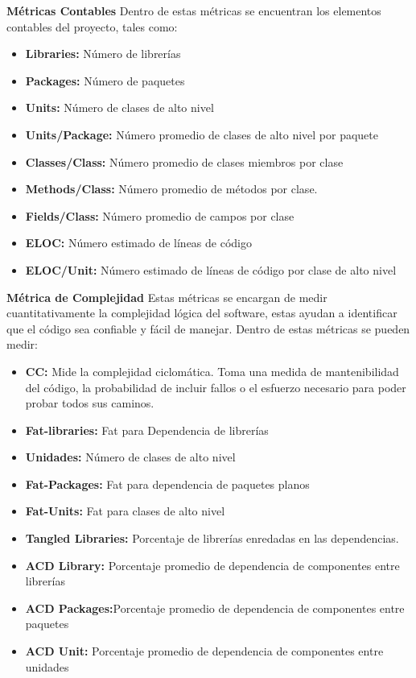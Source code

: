 \textbf{Métricas Contables} Dentro de estas métricas se encuentran los elementos contables del proyecto, tales como:
\begin{itemize}[itemsep=1mm,topsep=0pt,leftmargin=0.6in]
	\item\textbf{Libraries:} Número de librerías
	\item\textbf{Packages:} Número de paquetes
	\item\textbf{Units:} Número de clases de alto nivel
	\item\textbf{Units/Package:} Número promedio de clases de alto nivel por paquete
	\item\textbf{Classes/Class:} Número promedio de clases miembros por clase
	\item\textbf{Methods/Class:} Número promedio de métodos por clase.
	\item\textbf{Fields/Class:} Número promedio de campos por clase
	\item\textbf{ELOC:} Número estimado de líneas de código
	\item\textbf{ELOC/Unit:}  Número estimado de líneas de código por clase de alto nivel
\end{itemize}

\textbf{Métrica de Complejidad}
Estas métricas se encargan de medir cuantitativamente la complejidad lógica del software, estas ayudan a identificar que el código sea confiable y fácil de manejar. Dentro de estas métricas se pueden medir:
\begin{itemize}[itemsep=0mm,topsep=0pt,leftmargin=0.6in]
	\item\textbf{CC:} Mide la complejidad ciclomática. Toma una medida de mantenibilidad del código, la probabilidad de incluir fallos o el esfuerzo necesario para poder probar todos sus caminos\cite{ccmetric}.
	\item\textbf{Fat-libraries:} Fat para Dependencia de librerías
	\item\textbf{Unidades:} Número de clases de alto nivel
	\item\textbf{Fat-Packages:} Fat para dependencia de paquetes planos
	\item\textbf{Fat-Units:} Fat para clases de alto nivel
	\item\textbf{Tangled Libraries:} Porcentaje de librerías enredadas en las dependencias.
	\item\textbf{ACD Library:} Porcentaje promedio de dependencia de componentes entre librerías
	\item\textbf{ACD Packages:}Porcentaje promedio de dependencia de componentes entre paquetes
	\item\textbf{ACD Unit:}  Porcentaje promedio de dependencia de componentes entre unidades
\end{itemize}


